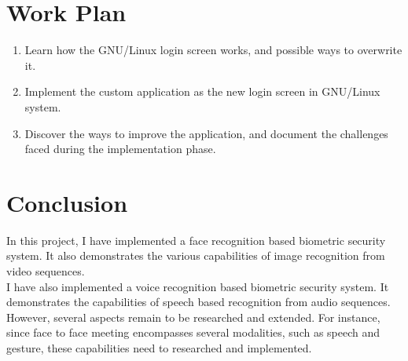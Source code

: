 \documentclass[conference]{IEEEtran}
\begin{document}
\section{Work Plan}
\begin{enumerate}
  \item Learn how the GNU/Linux login screen works, and possible ways to overwrite it.
  \item Implement the custom application as the new login screen in GNU/Linux system.
  \item Discover the ways to improve the application, and document the challenges
        faced during the implementation phase.
\end{enumerate}

\section{Conclusion}
In this project, I have implemented a face recognition based biometric
security system. It also demonstrates the various capabilities of image recognition
from video sequences. \\
I have also implemented a voice recognition based biometric security system. It demonstrates
the capabilities of speech based recognition from audio sequences. \\
However, several aspects remain to be researched and extended.
For instance, since face to face meeting encompasses several modalities, such as
speech and gesture, these capabilities need to researched and implemented. \\



%
%
\end{document}
